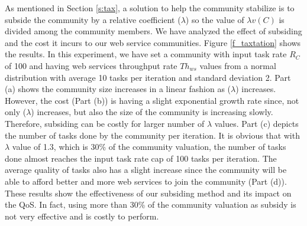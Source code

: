 As mentioned in Section \ref{s:tax}, a solution to help the
community stabilize is to subside the community by a relative
coefficient ($\lambda$) so the value of $\lambda v(C)$ is divided
among the community members. We have analyzed the effect of
subsiding and the cost it incurs to our web service communities.
Figure \ref{f_taxtation} shows the results. In this experiment, we
have set a community with input task rate $R_C$ of 100 and having
web services throughput rate $Th_{ws}$ values from a normal
distribution with average 10 tasks per iteration and standard
deviation 2. Part (a) shows the community size increases in a
linear fashion as ($\lambda$) increases. However, the cost (Part
(b)) is having a slight exponential growth rate since, not only
($\lambda$) increases, but also the size of the community is
increasing slowly. Therefore, subsiding can be costly for larger
number of $\lambda$ values. Part (c) depicts the number of tasks
done by the community per iteration. It is obvious that with
$\lambda$ value of 1.3, which is 30\% of the community valuation,
the number of tasks done almost reaches the input task rate cap of
100 tasks per iteration. The average quality of tasks also has a
slight increase since the community will be able to afford better
and more web services to join the community (Part (d)). These
results show the effectiveness of our subsiding method and its
impact on the QoS. In fact, using more than 30\% of the community
valuation as subsidy is not very effective and is costly to
perform.

